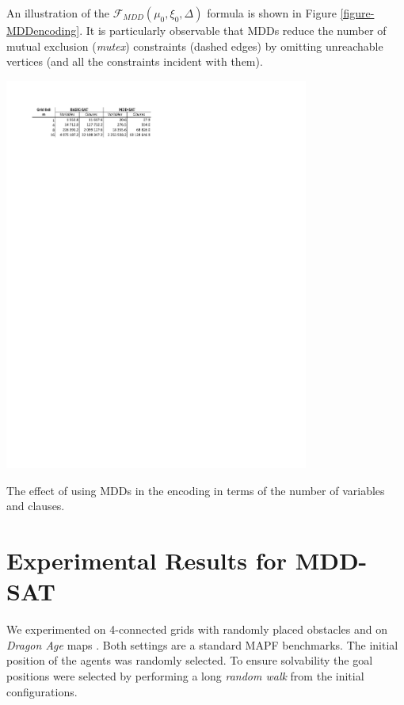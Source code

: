 \documentclass[jair,oneside,11pt]{article}
\begin{document}
An illustration of the $\mathcal{F}_{MDD}(\mu_0,\xi_0,\Delta)$ formula is shown in Figure \ref{figure-MDDencoding}. It is particularly observable that MDDs reduce the number of mutual exclusion ({\em mutex}) constraints (dashed edges) by omitting unreachable vertices (and all the constraints incident with them).


\begin{table}
\centering
\includegraphics[trim={2cm 23.9cm 11cm 1.9cm},clip,width=0.75\textwidth]{table_size_8x8.pdf}
\caption{The effect of using MDDs in the encoding in terms of the number of variables and clauses.} \label{table_size_8x8}
\end{table}


\section{Experimental Results for MDD-SAT}

We experimented on 4-connected grids with randomly placed obstacles \cite{DBLP:conf/aiide/Silver05} and on \textit{Dragon Age} maps \cite{CBSJUR,sturtevant2012benchmarks}. Both settings are a standard MAPF benchmarks. The initial position of the agents was randomly selected. To ensure solvability the goal positions were selected by performing a long \textit{random walk} from the initial configurations.
\end{document}
